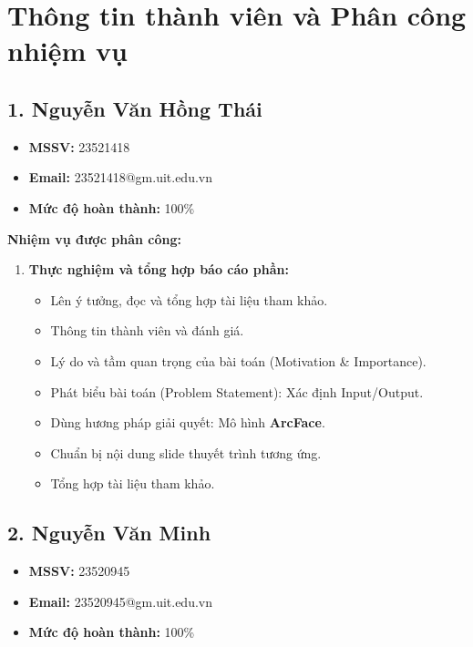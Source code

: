 \chapter{Thông tin thành viên và Phân công nhiệm vụ}

\section*{1. Nguyễn Văn Hồng Thái}
\begin{itemize}
    \item \textbf{MSSV:} 23521418
    \item \textbf{Email:} 23521418@gm.uit.edu.vn
    \item \textbf{Mức độ hoàn thành:} 100\%
\end{itemize}

\textbf{Nhiệm vụ được phân công:}
\begin{enumerate}
    \item \textbf{Thực nghiệm và tổng hợp báo cáo phần:}
    \begin{itemize}
        \item Lên ý tưởng, đọc và tổng hợp tài liệu tham khảo.
        \item Thông tin thành viên và đánh giá.
        \item Lý do và tầm quan trọng của bài toán (Motivation \& Importance).
        \item Phát biểu bài toán (Problem Statement): Xác định Input/Output.
        \item Dùng hương pháp giải quyết: Mô hình \textbf{ArcFace}.
        \item Chuẩn bị nội dung slide thuyết trình tương ứng.
        \item Tổng hợp tài liệu tham khảo.
    \end{itemize}
\end{enumerate}

\section*{2. Nguyễn Văn Minh}
\begin{itemize}
    \item \textbf{MSSV:} 23520945
    \item \textbf{Email:} 23520945@gm.uit.edu.vn
    \item \textbf{Mức độ hoàn thành:} 100\%
\end{itemize}

